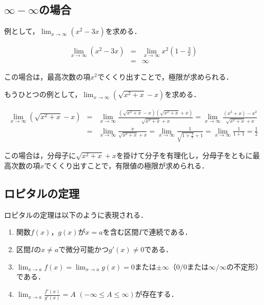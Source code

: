\subsection{$\infty - \infty$の場合}

例として，$\displaystyle \lim_{x \rightarrow \infty}(x^2-3x)$を求める．

\begin{eqnarray}
\lim_{x \rightarrow \infty}(x^2-3x) &=& \lim_{x \rightarrow \infty}x^2(1-\frac{3}{x}) \nonumber \\
&=& \infty
\end{eqnarray}

\noindent この場合は，最高次数の項$x^2$でくくり出すことで，極限が求められる．

もうひとつの例として，$\displaystyle \lim_{x \rightarrow \infty}(\sqrt{x^2+x}-x)$を求める．

\begin{eqnarray}
\lim_{x \rightarrow \infty}(\sqrt{x^2+x}-x) &=& \lim_{x \rightarrow \infty}\frac{(\sqrt{x^2+x}-x)(\sqrt{x^2+x}+x)}{\sqrt{x^2+x}+x} %
 =  \lim_{x \rightarrow \infty}\frac{(x^2+x)-x^2}{\sqrt{x^2+x}+x} \nonumber \\
&=& \lim_{x \rightarrow \infty}\frac{x}{\sqrt{x^2+x}+x} %
 =  \lim_{x \rightarrow \infty}\frac{1}{\sqrt{1+\frac{1}{x}}+1} %
 =  \lim_{x \rightarrow \infty}\frac{1}{1+1} %
 = \frac{1}{2}
\end{eqnarray}

\noindent この場合は，分母子に$\sqrt{x^2+x}+x$を掛けて分子を有理化し，分母子をともに最高次数の項$x$でくくり出すことで，有限値の極限が求められる．

\subsection{ロピタルの定理}

ロピタルの定理は以下のように表現される．

\begin{enumerate}
\item 関数$f(x)$，$g(x)$が$x=a$を含む区間$I$で連続である\footnotemark ．
\item 区間$I$の$x \neq a$で微分可能かつ$g'(x) \neq 0$である．
\item $\displaystyle \lim_{x \rightarrow a} f(x) = \lim_{x \rightarrow a} g(x) = 0$または$\pm \infty$（$0/0$または$\infty/\infty$の不定形）である．
\item $\displaystyle \lim_{x \rightarrow a} \frac{f'(x)}{g'(x)} = A$ $(-\infty \leq A \leq \infty)$が存在する．
\end{enumerate}

